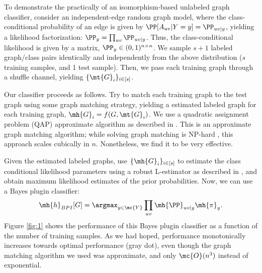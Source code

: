 \documentclass[10pt,journal,cspaper,compsoc]{IEEEtran}
\begin{document}
To demonstrate the practically of an isomorphism-based unlabeled graph classifier, consider an independent-edge random graph model, where the class-conditional probability of an edge is given by $\PP[A_{uv}|Y=y]=\PP_{uv|y}$, yielding a likelihood factorization: $\PP_y=\prod_{uv}\PP_{uv|y}$. Thus, the class-conditional likelihood is given by a matrix, $\PP_y \in (0,1)^{n \times n}$. We sample $s+1$ labeled graph/class pairs identically and independently from the above distribution ($s$ training samples, and 1 test sample). Then, we pass each training graph through a shuffle channel, yielding $\{\mt{G}_i\}_{i \in [s]}$.

Our classifier  proceeds as follows.  Try to match each training graph to the test graph using some graph matching strategy, yielding a estimated labeled graph for each training graph, $\mh{G}_i=f(G,\mt{G}_i)$.  We  use a quadratic assignment problem (QAP) approximate algorithm as described in \cite{VP11QAP}.  This is an approximate graph matching algorithm; while solving graph matching is NP-hard \cite{Conte2004}, this approach scales cubically in $n$.  Nonetheless, we find it to be very effective.

Given the estimated labeled graphs, use $\{\mh{G}_i\}_{i \in [s]}$ to estimate the class conditional likelihood parameters using a robust L-estimator as described in \cite{VP11sigsub}, and obtain maximum likelihood estimates of the prior probabilities.  Now, we can use a Bayes plugin classifier:
\begin{align}
	\mh{h}_{BPI}[G]=\argmax_{y\in\mc{Y}} \prod_{uv} \mh{\PP}_{uv|y}\mh{\pi}_y.
\end{align}
Figure \ref{fig:1} shows the performance of this Bayes plugin classifier as a function of the number of training samples.  As we had hoped, performance monotonically increases towards optimal performance (gray dot), even though the graph matching algorithm we used was approximate, and only $\mc{O}(n^3)$ instead of exponential.
\end{document}
